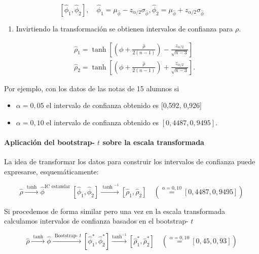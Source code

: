 \documentclass[
]{article}
\providecommand{\tightlist}{%
  \setlength{\itemsep}{0pt}\setlength{\parskip}{0pt}}
\begin{document}
\[
\left[\hat{\phi}_{1}, \hat{\phi}_{2}\right], \quad \hat{\phi}_{1}=\mu_{\hat{\phi}}-z_{\alpha / 2} \sigma_{\hat{\phi}}, \hat{\phi}_{2}=\mu_{\hat{\phi}}+z_{\alpha / 2} \sigma_{\hat{\phi}}
\]

\begin{enumerate}
\def\labelenumi{\arabic{enumi}.}
\setcounter{enumi}{2}
\tightlist
\item
  Invirtiendo la transformación se obtienen intervalos de confianza para \(\rho\).
\end{enumerate}

\[
\begin{aligned}
& \hat{\rho}_{1}=\tanh \left[\left(\phi+\frac{\hat{\rho}}{2(n-1)}\right)-\frac{z_{\alpha / 2}}{\sqrt{n-3}}\right] \\
& \hat{\rho}_{2}=\tanh \left[\left(\phi+\frac{\hat{\rho}}{2(n-1)}\right)+\frac{z_{\alpha / 2}}{\sqrt{n-3}}\right] .
\end{aligned}
\]

Por ejemplo, con los datos de las notas de 15 alumnos si

\begin{itemize}
\tightlist
\item
  \(\alpha=0,05\) el intervalo de confianza obtenido es {[}0,592, 0,926{]}
\item
  \(\alpha=0,10\) el intervalo de confianza obtenido es \([0,4487,0,9495]\).
\end{itemize}

\paragraph{\texorpdfstring{Aplicación del bootstrap- \(t\) sobre la escala transformada}{Aplicación del bootstrap- t sobre la escala transformada}}\label{aplicaciuxf3n-del-bootstrap--t-sobre-la-escala-transformada}

La idea de transformar los datos para construir los intervalos de confianza puede expresarse, esquemáticamente:

\[
\hat{\rho} \xrightarrow{\text { tanh }} \hat{\phi}^{\text {IC estandar }}\left[\hat{\phi}_{1}, \hat{\phi}_{2}\right] \xrightarrow{\text { tanh }^{-1}}\left[\hat{\rho}_{1}, \hat{\rho}_{2}\right] \quad(\stackrel{\alpha=0,10}{=}[0,4487,0,9495])
\]

Si procedemos de forma similar pero una vez en la escala transformada calculamos intervalos de confianza basados en el bootstrap- \(t\)

\[
\hat{\rho} \xrightarrow{\text { tanh }} \hat{\phi} \xrightarrow{\text { Bootstrap- } t}\left[\hat{\phi}_{1}^{*}, \hat{\phi}_{2}^{*}\right] \xrightarrow{\tanh ^{-1}}\left[\hat{\rho}_{1}^{*}, \hat{\rho}_{2}^{*}\right] \quad(\stackrel{\alpha=0,10}{=}[0,45,0,93])
\]
\end{document}
